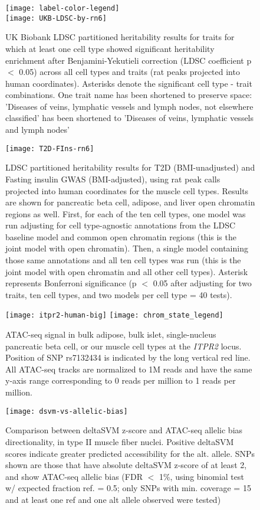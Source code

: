 \documentclass{article}
\begin{document}
\begin{figure}
	\texttt{[image: label-color-legend]}\\
	\texttt{[image: UKB-LDSC-by-rn6]}
	\caption{UK Biobank LDSC partitioned heritability results for traits for which at least one cell type showed significant heritability enrichment after Benjamini-Yekutieli correction (LDSC coefficient p $<$ 0.05) across all cell types and traits (rat peaks projected into human coordinates). Asterisks denote the significant cell type - trait combinations. One trait name has been shortened to preserve space: 'Diseases of veins, lymphatic vessels and lymph nodes, not elsewhere classified' has been shortened to 'Diseases of veins, lymphatic vessels and lymph nodes'}
\end{figure}

\begin{figure}
	\texttt{[image: T2D-FIns-rn6]}
	\caption{LDSC partitioned heritability results for T2D (BMI-unadjusted) and Fasting insulin GWAS (BMI-adjusted), using rat peak calls projected into human coordinates for the muscle cell types. Results are shown for pancreatic beta cell, adipose, and liver open chromatin regions as well. First, for each of the ten cell types, one model was run adjusting for cell type-agnostic annotations from the LDSC baseline model and common open chromatin regions (this is the joint model with open chromatin). Then, a single model containing those same annotations and all ten cell types was run (this is the joint model with open chromatin and all other cell types). Asterisk represents Bonferroni significance (p $<$ 0.05 after adjusting for two traits, ten cell types, and two models per cell type = 40 tests).} 
\end{figure}

\begin{figure}
	\texttt{[image: itpr2-human-big]}
\texttt{[image: chrom\_state\_legend]}
	\caption{ATAC-seq signal in bulk adipose, bulk islet, single-nucleus pancreatic beta cell, or our muscle cell types at the \textit{ITPR2} locus. Position of SNP rs7132434 is indicated by the long vertical red line. All ATAC-seq tracks are normalized to 1M reads and have the same y-axis range corresponding to 0 reads per million to 1 reads per million.}
\end{figure}

\begin{figure}
	\texttt{[image: dsvm-vs-allelic-bias]}
	\caption{Comparison between deltaSVM z-score and ATAC-seq allelic bias directionality, in type II muscle fiber nuclei. Positive deltaSVM scores indicate greater predicted accessibility for the alt. allele. SNPs shown are those that have absolute deltaSVM z-score of at least 2, and show ATAC-seq allelic bias (FDR $<$ 1\%, using binomial test w/ expected fraction ref. = 0.5; only SNPs with min. coverage = 15 and at least one ref and one alt allele observed were tested)}
\end{figure}
\end{document}
